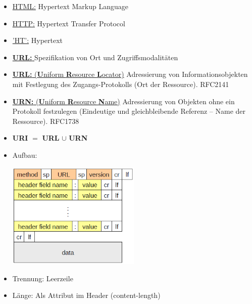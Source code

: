 
\begin{itemize}
    \item \underline{HTML:} Hypertext Markup Language
    \item \underline{HTTP:} Hypertext Transfer Protocol
    \item \underline{'HT':} Hypertext
\end{itemize}

\begin{itemize}
    \item \underline{\textbf{URL: }} Spezifikation von Ort und Zugriffsmodalitäten
    \item \underline{\textbf{URL:} (\textbf{U}niform \textbf{R}esource \textbf{L}ocator)} Adressierung von Informationsobjekten mit Festlegung des Zugangs-Protokolls (Ort der Ressource). RFC2141
    \item \underline{\textbf{URN:} (\textbf{U}niform \textbf{R}esource \textbf{N}ame)} Adressierung von Objekten ohne ein Protokoll festzulegen (Eindeutige und gleichbleibende Referenz – Name der Ressource). RFC1738
    \item \textbf{URI} $=$ \textbf{URL} $\cup$ \textbf{URN}
\end{itemize}

\begin{itemize}
    \item Aufbau:
    \begin{center}
        \includegraphics[width=0.5\textwidth]{img/HTTP_RequestHeader}
    \end{center}
    \item Trennung: Leerzeile
    \item Länge: Als Attribut im Header (content-length)
\end{itemize}

